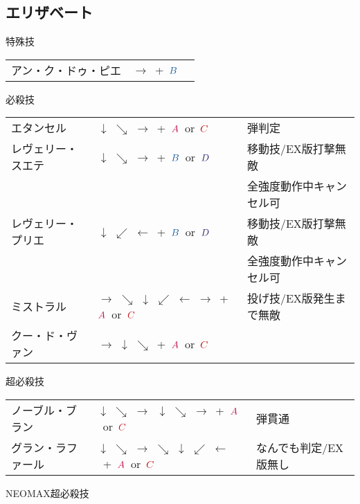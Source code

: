 \documentclass[a4j,11pt]{jarticle}
\def\A{$\textcolor{Acolor}{A}$}
\def\C{$\textcolor{Ccolor}{C}$}
\def\B{$\textcolor{Bcolor}{B}$}
\def\D{$\textcolor{Dcolor}{D}$}
\def\hado{$\downarrow$ $\searrow$ $\rightarrow$}%
\def\tatsu{$\downarrow$ $\swarrow$ $\leftarrow$}%
\def\syoryu{$\rightarrow$ $\downarrow$ $\searrow$}%
\def\tenti{$\rightarrow$ $\searrow$ $\downarrow$ $\swarrow$ $\leftarrow$ $\rightarrow$}%
\def\ryuko{$\downarrow$ $\searrow$ $\rightarrow$ $\searrow$ $\downarrow$ $\swarrow$ $\leftarrow$}%
\def\orochi{$\downarrow$ $\swarrow$ $\leftarrow$ $\swarrow$ $\downarrow$ $\searrow$ $\rightarrow$}%
\begin{document}
\subsection{エリザベート}
\begin{itembox}[l]{特殊技}
\begin{tabular}{lll}
アン・ク・ドゥ・ピエ&$\rightarrow$\ +\ \B&%
\end{tabular}
\end{itembox}
\begin{itembox}[l]{必殺技}
\begin{tabular}{lll}
エタンセル&\hado\ +\ \A\ or\ \C&弾判定\\%
レヴェリー・スエテ&\hado\ +\ \B\ or\ \D&移動技/EX版打撃無敵\\%
&&全強度動作中キャンセル可\\
レヴェリー・プリエ&\tatsu\ +\ \B\ or\ \D&移動技/EX版打撃無敵\\%
&&全強度動作中キャンセル可\\
ミストラル&\tenti\ +\ \A\ or\ \C&投げ技/EX版発生まで無敵\\%
クー・ド・ヴァン&\syoryu\ +\ \A\ or\ \C&%
\end{tabular}
\end{itembox}
\begin{itembox}[l]{超必殺技}
\begin{tabular}{lll}
ノーブル・ブラン&\hado\ \hado\ +\ \A\ or\ \C&弾貫通\\%
グラン・ラファール&\ryuko\ +\ \A\ or\ \C&なんでも判定/EX版無し%
\end{tabular}
\end{itembox}
\begin{itembox}[l]{NEOMAX超必殺技}
\end{itembox}
\newpage
\end{document}
